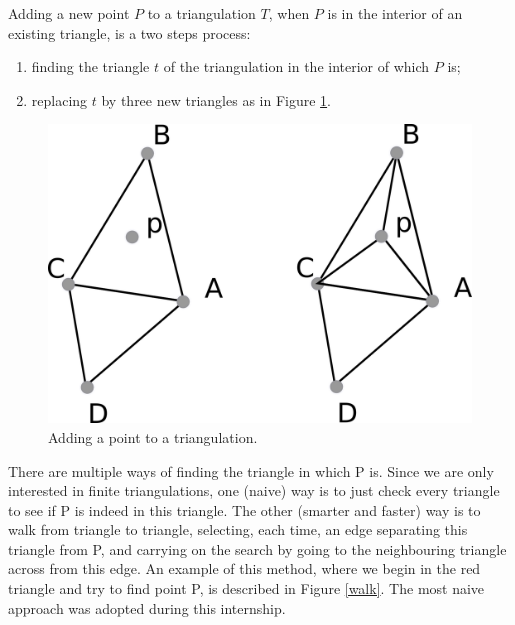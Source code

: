 \documentclass[a4paper,10pt]{article}
\begin{document}
Adding a new point $P$ to a triangulation $T$, when $P$ is in the interior of an existing triangle, is a two steps process:
\begin{enumerate}
\item finding the triangle $t$ of the triangulation in the interior of which $P$ is;
\item replacing $t$ by three new triangles as in Figure \ref{adding}.
\end{enumerate}
\begin{figure}
\centering
\includegraphics[scale=2]{adding}
\caption{\label{adding} Adding a point to a triangulation.}
\end{figure}

There are multiple ways of finding the triangle in which P is. Since we are only interested in finite triangulations, one (naive) way is to just check every triangle to see if P is indeed in this triangle. The other (smarter and faster) way is to walk from triangle to triangle, selecting, each time, an edge separating this triangle from P, and carrying on the search by going to the neighbouring triangle across from this edge. An example of this method, where we begin in the red triangle and try to find point P, is described in Figure \ref{walk}.
The most naive approach was adopted during this internship.
\end{document}
